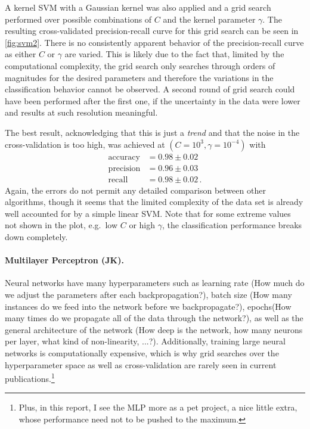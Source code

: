 \documentclass[12pt, a4paper]{scrartcl}
\begin{document}
A kernel SVM with a Gaussian kernel was also applied and a grid search performed over possible combinations of $C$ and the kernel parameter $\gamma$.
The resulting cross-validated precision-recall curve for this grid search can be seen in \cref{fig:svm2}.
There is no consistently apparent behavior of the precision-recall curve as either $C$ or $\gamma$ are varied. This is likely due to the fact that, limited by the computational complexity, the grid search only searches through orders of magnitudes for the desired parameters and therefore the variations in the classification behavior cannot be observed. A second round of grid search could have been performed after the first one, if the uncertainty in the data were lower and results at such resolution meaningful.

The best result, acknowledging that this is just a \emph{trend} and that the noise in the cross-validation is too high, was achieved at $(C=10^3, \gamma=10^{-4})$ with
\begin{align*}
	\text{accuracy} &= 0.98 \pm 0.02 \\
	\text{precision} &= 0.96 \pm 0.03 \\
	\text{recall} &= 0.98 \pm 0.02 \, .
\end{align*}
Again, the errors do not permit any detailed comparison between other algorithms, though it seems that the limited complexity of the data set is already well accounted for by a simple linear SVM. Note that for some extreme values not shown in the plot, e.g.\ low $C$ or high $\gamma$, the classification performance breaks down completely.

\paragraph{Multilayer Perceptron (JK).} Neural networks have many hyperparameters such as learning rate (How much do we adjust the parameters after each backpropagation?), batch size (How many instances do we feed into the network before we backpropagate?), epochs(How many times do we propagate all of the data through the network?), as well as the general architecture of the network (How deep is the network, how many neurons per layer, what kind of non-linearity, ...?). Additionally, training large neural networks is computationally expensive, which is why grid searches over the hyperparameter space as well as cross-validation are rarely seen in current publications.\footnote{Plus, in this report, I see the MLP more as a pet project, a nice little extra, whose performance need not to be pushed to the maximum.}
\end{document}
